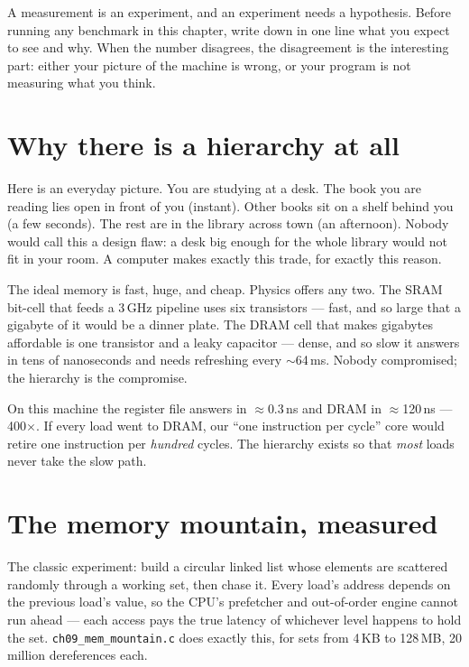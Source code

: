 \begin{rulebox}
A measurement is an experiment, and an experiment needs a hypothesis.
Before running any benchmark in this chapter, write down in one line
what you expect to see and why. When the number disagrees, the
disagreement is the interesting part: either your picture of the
machine is wrong, or your program is not measuring what you think.
\end{rulebox}

\section{Why there is a hierarchy at all}
\label{sec:why09}

Here is an everyday picture. You are studying at a desk. The book you
are reading lies open in front of you (instant). Other books sit on a
shelf behind you (a few seconds). The rest are in the library across
town (an afternoon). Nobody would call this a design flaw: a desk big
enough for the whole library would not fit in your room. A computer
makes exactly this trade, for exactly this reason.

The ideal memory is fast, huge, and cheap. Physics offers any two.
The SRAM bit-cell that feeds a 3\,GHz pipeline uses six transistors
--- fast, and so large that a gigabyte of it would be a dinner plate.
The DRAM cell that makes gigabytes affordable is one transistor and
a leaky capacitor --- dense, and so slow it answers in tens of
nanoseconds and needs refreshing every $\sim$64\,ms. Nobody
compromised; the hierarchy is the compromise.



\begin{example}
On this machine the register file answers in $\approx$0.3\,ns and
DRAM in $\approx$120\,ns --- 400$\times$. If every load went to DRAM,
our ``one instruction per cycle'' core would retire one instruction
per \emph{hundred} cycles. The hierarchy exists so that
\emph{most} loads never take the slow path.
\end{example}



\section{The memory mountain, measured}
\label{sec:mountain09}

The classic experiment: build a circular linked list whose elements
are scattered randomly through a working set, then chase it. Every
load's address depends on the previous load's value, so the CPU's
prefetcher and out-of-order engine cannot run ahead --- each access
pays the true latency of whichever level happens to hold the set.
\texttt{ch09\_mem\_mountain.c} does exactly this, for sets from
4\,KB to 128\,MB, 20 million dereferences each.


